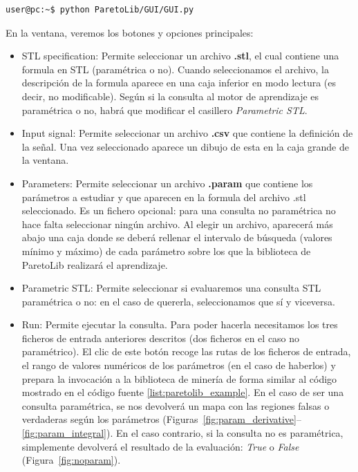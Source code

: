 \begin{lstlisting}[language=bash,
				   style=console_style,
				   label={list:paretolib_gui},
				   caption={Inicio de la interfaz gráfica de usuario de ParetoLib.}]
user@pc:~$ python ParetoLib/GUI/GUI.py
\end{lstlisting}

En la ventana, veremos los botones y opciones principales:
\begin{itemize}
\item STL specification: Permite seleccionar un archivo \textbf{.stl}, el cual contiene una formula en STL (paramétrica o no). Cuando seleccionamos el archivo, la descripción de la formula aparece en una caja inferior en modo lectura (es decir, no modificable). Según si la consulta al motor de aprendizaje es paramétrica o no, habrá que modificar el casillero \textit{Parametric STL}.

\item Input signal: Permite seleccionar un archivo \textbf{.csv} que contiene la definición de la señal. Una vez seleccionado aparece un dibujo de esta en la caja grande de la ventana.

\item Parameters: Permite seleccionar un archivo \textbf{.param} que contiene los parámetros a estudiar y que aparecen en la formula del archivo .stl seleccionado. Es un fichero opcional: para una consulta no paramétrica no hace falta seleccionar ningún archivo. Al elegir un archivo, aparecerá más abajo una caja donde se deberá rellenar el intervalo de búsqueda (valores mínimo y máximo) de cada parámetro sobre los que la biblioteca de ParetoLib realizará el aprendizaje.

\item Parametric STL: Permite seleccionar si evaluaremos una consulta STL paramétrica o no: en el caso de quererla, seleccionamos que sí y viceversa.

\item Run: Permite ejecutar la consulta. Para poder hacerla necesitamos los tres ficheros de entrada anteriores descritos (dos ficheros en el caso no paramétrico). El clic de este botón recoge las rutas de los ficheros de entrada, el rango de valores numéricos de los parámetros (en el caso de haberlos) y prepara la invocación a la biblioteca de minería de forma similar al código mostrado en el código fuente \ref{list:paretolib_example}. En el caso de ser una consulta paramétrica, se nos devolverá un mapa con las regiones falsas o verdaderas según los parámetros (Figuras~\ref{fig:param_derivative}--\ref{fig:param_integral}). En el caso contrario, si la consulta no es paramétrica, simplemente devolverá el resultado de la evaluación: \textit{True} o \textit{False} (Figura~\ref{fig:noparam}).
\end{itemize}

